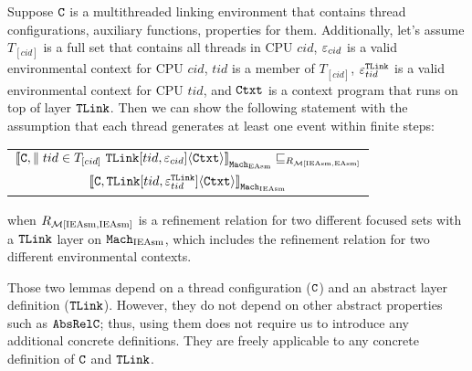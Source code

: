 \begin{lemma}
\label{lemma:chapter:conlink:easm-refines-single-ieasm}
Suppose  ${{\mathrm{\texttt{C}}}}$ is a multithreaded linking environment that contains thread configurations, auxiliary functions, properties for them.
Additionally, let's assume   $T_{[cid]}$ is a full set that contains all threads in CPU $cid$, 
 ${\varepsilon}_{cid}$ is a valid
environmental context for CPU $cid$,
$tid$ is a member of $T_{[cid]}$,
 ${\varepsilon}^{{{\mathrm{\texttt{TLink}}}}}_{tid}$ is a valid
environmental context for CPU $tid$,
and ${\mathrm{\texttt{Ctxt}}}$ is a
context program that runs on top of layer ${{\mathrm{\texttt{TLink}}}}$.
 Then we can show the following statement
 with the assumption that each thread generates at least one event within finite steps:
 \begin{center}
\begin{tabular}{c}
${[\![{{{\mathrm{\texttt{C}}}}, \parallel tid \in T_{[cid]} \  {{\mathrm{\texttt{TLink}}}}[tid, {\varepsilon}_{cid}]} \langle {{\mathrm{\texttt{Ctxt}}}} \rangle]\!]}_{{\mathrm{\texttt{Mach}}}_{\mathrm{EAsm}}} \sqsubseteq_{R_{\mathcal{M}{[\mathrm{IEAsm}, \mathrm{EAsm}]}}}$\\ 
${[\![{{{\mathrm{\texttt{C}}}}, {{\mathrm{\texttt{TLink}}}}[tid, {\varepsilon}^{{{\mathrm{\texttt{TLink}}}}}_{tid}]} \langle {{\mathrm{\texttt{Ctxt}}}} \rangle]\!]}_{{\mathrm{\texttt{Mach}}}_{\mathrm{IEAsm}}}$\\
\end{tabular}
\end{center}
when $R_{\mathcal{M}{[\mathrm{IEAsm}, \mathrm{IEAsm}]}}$ is a refinement relation for two different focused sets with a ${{\mathrm{\texttt{TLink}}}}$ layer on
${\mathrm{\texttt{Mach}}}_{\mathrm{IEAsm}}$, which includes the refinement relation for two different environmental contexts.
\end{lemma}

Those two lemmas depend on a thread configuration (${{\mathrm{\texttt{C}}}}$) and an abstract layer definition (${{\mathrm{\texttt{TLink}}}}$).
However, they do not depend on other abstract properties such as ${{\mathrm{\texttt{AbsRelC}}}}$; thus,
using them does not require us to introduce any additional concrete definitions. 
They are freely applicable to any concrete definition of ${{\mathrm{\texttt{C}}}}$ and ${{\mathrm{\texttt{TLink}}}}$. 


%
%
%

